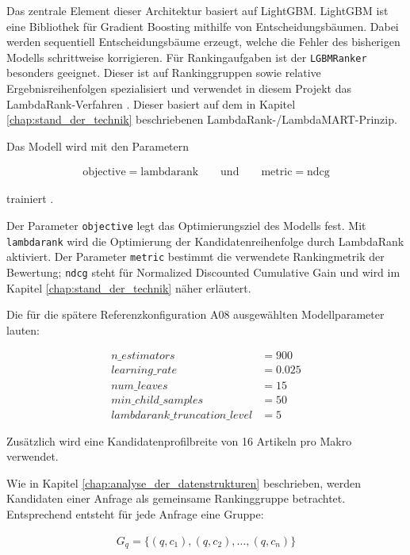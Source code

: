 Das zentrale Element dieser Architektur basiert auf LightGBM. LightGBM ist eine Bibliothek für Gradient Boosting mithilfe von Entscheidungsbäumen. Dabei werden sequentiell Entscheidungsbäume erzeugt, welche die Fehler des bisherigen Modells schrittweise korrigieren. Für Rankingaufgaben ist der \texttt{LGBMRanker} besonders geeignet. Dieser ist auf Rankinggruppen sowie relative Ergebnisreihenfolgen spezialisiert und verwendet in diesem Projekt das LambdaRank-Verfahren \parencite{LightGBM}.
Dieser basiert auf dem in Kapitel \ref{chap:stand_der_technik} beschriebenen LambdaRank-/LambdaMART-Prinzip.

Das Modell wird mit den Parametern 

\begin{align} 
    \text{objective} = \text{lambdarank} \qquad \text{und} \qquad \text{metric} = \text{ndcg}
\end{align} 

trainiert \parencite{srcStep931}.

Der Parameter \texttt{objective} legt das Optimierungsziel des Modells fest. Mit \texttt{lambdarank} wird die Optimierung der Kandidatenreihenfolge durch LambdaRank aktiviert. Der Parameter \texttt{metric} bestimmt die verwendete Rankingmetrik der Bewertung; \texttt{ndcg} steht für Normalized Discounted Cumulative Gain und wird im Kapitel \ref{chap:stand_der_technik} näher erläutert.

Die für die spätere Referenzkonfiguration A08 ausgewählten Modellparameter lauten: 

\begin{align} 
    n\_estimators &= 900 \\ 
    learning\_rate &= 0.025 \\ 
    num\_leaves &= 15 \\ 
    min\_child\_samples &= 50 \\ 
    lambdarank\_truncation\_level &= 5 
\end{align}

Zusätzlich wird eine Kandidatenprofilbreite von 16 Artikeln pro Makro verwendet. 

Wie in Kapitel \ref{chap:analyse_der_datenstrukturen} beschrieben, werden Kandidaten einer Anfrage als gemeinsame Rankinggruppe betrachtet.
Entsprechend entsteht für jede Anfrage eine Gruppe:

\begin{align} 
    G_q = \{(q,c_1),(q,c_2),\dots,(q,c_n)\} 
\end{align} 

